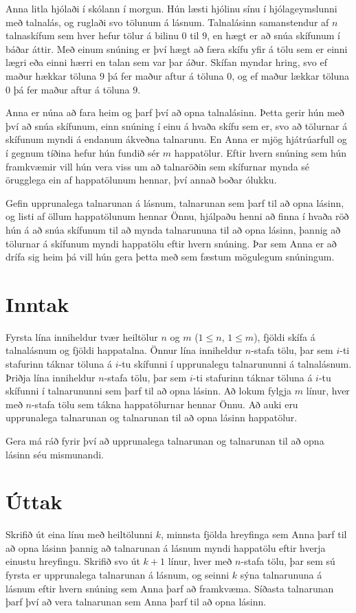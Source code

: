 Anna litla hjólaði í skólann í morgun. Hún læsti hjólinu sínu í
hjólageymslunni með talnalás, og ruglaði svo tölunum á lásnum. Talnalásinn
samanstendur af $n$ talnaskífum sem hver hefur tölur á bilinu $0$ til $9$, en
hægt er að snúa skífunum í báðar áttir. Með einum snúning er því hægt að færa
skífu yfir á tölu sem er einni lægri eða einni hærri en talan sem var þar
áður. Skífan myndar hring, svo ef maður hækkar töluna $9$ þá fer maður aftur
á töluna $0$, og ef maður lækkar töluna $0$ þá fer maður aftur á töluna $9$.

Anna er núna að fara heim og þarf því að opna talnalásinn. Þetta gerir hún
með því að snúa skífunum, einn snúning í einu á hvaða skífu sem er, svo að
tölurnar á skífunum myndi á endanum ákveðna talnarunu. En Anna er mjög
hjátrúarfull og í gegnum tíðina hefur hún fundið sér $m$ happatölur. Eftir
hvern snúning sem hún framkvæmir vill hún vera viss um að talnaröðin sem
skífurnar mynda sé örugglega ein af happatölunum hennar, því annað boðar
ólukku.

Gefin upprunalega talnarunan á lásnum, talnarunan sem þarf til að opna
lásinn, og listi af öllum happatölunum hennar Önnu, hjálpaðu henni að finna í
hvaða röð hún á að snúa skífunum til að mynda talnarununa til að opna lásinn,
þannig að tölurnar á skífunum myndi happatölu eftir hvern snúning. Þar sem Anna
er að drífa sig heim þá vill hún gera þetta með sem fæstum mögulegum snúningum.

\section*{Inntak}
Fyrsta lína inniheldur tvær heiltölur $n$ og $m$ ($1 \leq n$, $1 \leq m$),
fjöldi skífa á talnalásnum og fjöldi happatalna. Önnur lína inniheldur
$n$-stafa tölu, þar sem $i$-ti stafurinn táknar töluna á $i$-tu skífunni í
upprunalegu talnarununni á talnalásnum. Þriðja lína inniheldur
$n$-stafa tölu, þar sem $i$-ti stafurinn táknar töluna á $i$-tu skífunni í
talnarununni sem þarf til að opna lásinn. Að lokum fylgja $m$ línur, hver með
$n$-stafa tölu sem tákna happatölurnar hennar Önnu. Að auki eru upprunalega
talnarunan og talnarunan til að opna lásinn happatölur.

Gera má ráð fyrir því að upprunalega talnarunan og talnarunan til að opna
lásinn séu mismunandi.

\section*{Úttak}
Skrifið út eina línu með heiltölunni $k$, minnsta fjölda hreyfinga sem Anna
þarf til að opna lásinn þannig að talnarunan á lásnum myndi happatölu eftir
hverja einustu hreyfingu. Skrifið svo út $k+1$ línur, hver með $n$-stafa tölu,
þar sem sú fyrsta er upprunalega talnarunan á lásnum, og seinni $k$ sýna
talnarununa á lásnum eftir hvern snúning sem Anna þarf að framkvæma. Síðasta
talnarunan þarf því að vera talnarunan sem Anna þarf til að opna lásinn. 

